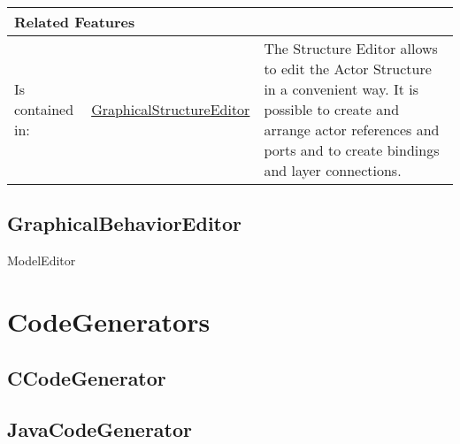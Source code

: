 			\vspace{\baselineskip}
			\begingroup
			\renewcommand{\arraystretch}{1.8} %
			\parbox{\textwidth}{
			\begin{longtable}{l l p{}}
				\multicolumn{2}{l}{\textbf{\large Related Features}} & \\
				\hline
			Is contained in: & \tabitem \hyperlink{ref:GraphicalStructureEditor}{GraphicalStructureEditor}  & The Structure Editor allows to edit the Actor Structure in a convenient way. It is possible to create and arrange actor references and ports and to create bindings and layer connections.\\
			\hline
			\end{longtable}	
			}
			\endgroup
			\vspace{\baselineskip}
			
			
		\subsection{GraphicalBehaviorEditor}
		ModelEditor
	
		
\section{CodeGenerators}
	
		\subsection{CCodeGenerator}
	
		
		\subsection{JavaCodeGenerator}
	
		


